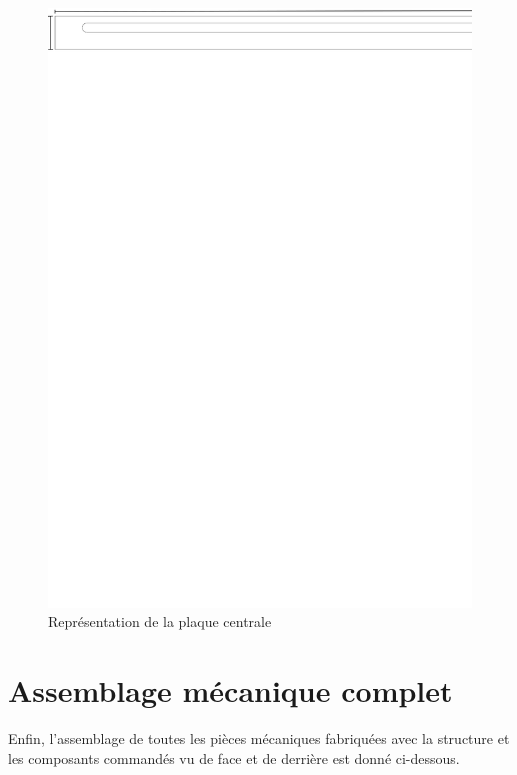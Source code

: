 \begin{figure}[H]
    \centering
    \includegraphics[width = \textwidth]{assets/figures/PlaquePassageMoteur.svg}
    \caption{Représentation de la plaque centrale}
    \label{fig:PLaPassMot}
\end{figure}

\section{Assemblage mécanique complet}\label{sec:AssMecComp}
Enfin, l'assemblage de toutes les pièces mécaniques fabriquées avec la structure et les composants commandés vu de face et de derrière est
donné ci-dessous.


